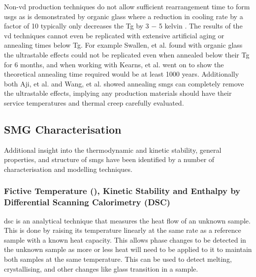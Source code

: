 \documentclass[a4paper,12pt,oneside]{report}%
\begin{document}
Non-\gls{vd} production techniques do not allow sufficient rearrangement time to form \glspl{usg} as is demonstrated by organic glass where a reduction in cooling rate by a factor of 10 typically only decreases the \gls{Tg} by 3 $-$ 5 kelvin \cite{Ediger1996, Dawson2011}.  The results of the \gls{vd} techniques cannot even be replicated with extensive artificial aging or annealing times below \gls{Tg}. For example Swallen, et al. \cite{Swallen2007} found with organic glass  the ultrastable effects could not be replicated even when annealed below their \gls{Tg} for 6 months, and when working with Kearns, et al. \cite{Kearns2008} went on to show the theoretical annealing time required would be at least 1000 years. Additionally both Aji, et al. \cite{Aji2013} and Wang, et al. \cite{Wang2014} showed annealing \glspl{smg} can completely remove the ultrastable effects, implying any production materials should have their service temperatures and thermal creep carefully evaluated.

\subsection{SMG Characterisation}
Additional insight into the thermodynamic and kinetic stability, general properties, and structure of \glspl{smg} have been identified by a number of characterisation and modelling techniques. 

\subsubsection{Fictive Temperature (\Tf), Kinetic Stability and Enthalpy by Differential Scanning Calorimetry (DSC)}
\Gls{dsc} is an analytical technique that measures the heat flow of an unknown sample. This is done by raising its temperature linearly at the same rate as a reference sample with a known heat capacity. This allows phase changes to be detected in the unknown sample as more or less heat will need to be applied to it to maintain both samples at the same temperature. This can be used to detect melting, crystallising, and other changes like glass transition in a sample.
\end{document}
